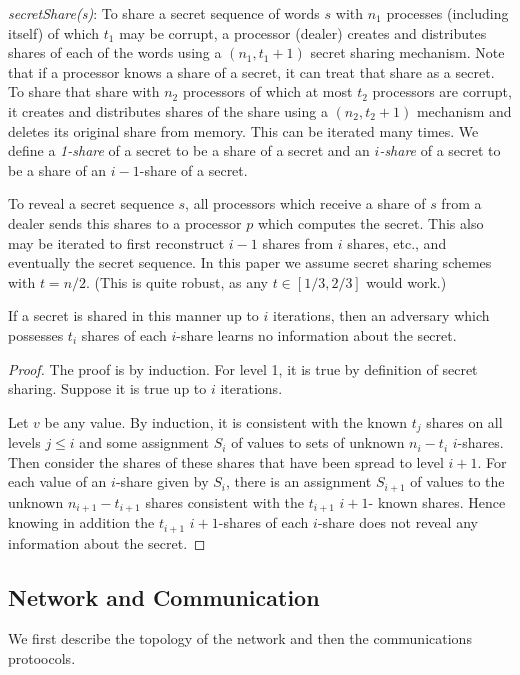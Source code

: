 \documentclass{sig-alternate}
\begin{document}
\begin{definition}
{\it secretShare(s)}:   To share a secret sequence of words $s$ with $n_1$ processes (including itself)  of which $t_1$ may be corrupt, a processor (dealer) creates and distributes shares of each of the words using a $(n_1, t_1+1)$ secret sharing mechanism. 
Note that if a processor knows a share of a secret, it can treat that share as a secret. To share that share with  $n_2$ processors of which at most $t_2$ processors are corrupt,  it creates and  distributes shares of the share
using a $(n_2, t_2+1)$ mechanism and deletes its original share from memory. This can be iterated many times.
We define a {\it 1-share} of a secret to be a share of a secret and an {\it $i$-share} of a secret to be a share of an $i-1$-share of a secret.
\end{definition}
To reveal a secret sequence $s$, all processors which receive a share of $s$ from a dealer sends this shares to a processor  $p$ which computes the secret. This also may be iterated to first reconstruct  $i-1$ shares from $i$ shares, etc.,  and eventually the secret sequence. 
In this paper we assume secret sharing schemes with $t=n/2$. (This is quite robust, as any $t \in [1/3,2/3]$ would work.)


\begin{lemma} \label{secret}  If a secret  is shared in this manner  up to $i$ iterations, then an adversary which possesses  $t_i$ shares of each $i$-share learns no information about the secret.  \end{lemma}
\begin{proof}
The proof is by induction. For level 1, it is true by definition of secret sharing.
Suppose it is true up to $i$ iterations. 

 Let $v$ be any value. By induction, it is consistent
with the  known $t_j$ shares  on all levels $j \leq i$ and some assignment $S_i$ of values to sets of unknown $n_i-t_{i}$ $i$-shares. Then
consider the shares of these shares that have been spread to level $i+1$.  For each  value of an $i$-share given by $S_i$,  there is an assignment $S_{i+1}$ of values to the unknown  $n_{i+1}-t_{i+1}$ shares  consistent with the $t_{i+1}$ $i+1$- known shares.  Hence knowing in addition the
$t_{i+1}$ $i+1$-shares of each
$i$-share does not reveal any information about  the secret. 
\end{proof}





\subsection{Network and Communication}\label{network}
We first describe the topology of the network and then the communications protoocols. 
\end{document}
